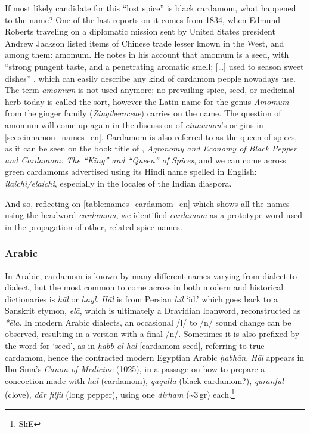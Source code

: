 If most likely candidate for this ``lost spice'' is black cardamom, what happened to the name? One of the last reports on it comes from 1834, when Edmund Roberts traveling on a diplomatic mission sent by United States president Andrew Jackson listed items of Chinese trade lesser known in the West, and among them: amomum. He notes in his account that amomum is a seed, with ``strong pungent taste, and a penetrating aromatic smell; […] used to season sweet dishes'' \autocite[135]{roberts_embassy_1837}, which can easily describe any kind of cardamom people nowadays use. The term \textit{amomum} is not used anymore; no prevailing spice, seed, or medicinal herb today is called the sort, however the Latin name for the genus \textit{Amomum} from the ginger family (\textit{Zingiberaceae}) carries on the name. The question of amomum will come up again in the discussion of \textit{cinnamon}'s origins in \cref{sec:cinnamon_names_en}. Cardamom is also referred to as the queen of spices, as it can be seen on the book title of \textcite{nair_agronomy_2011}, \textit{Agronomy and Economy
of Black Pepper and Cardamom: The ``King'' and ``Queen'' of Spices}, and we can come across green cardamoms advertised using its Hindi name spelled in English: \textit{ilaichi/elaichi}, especially in the locales of the Indian diaspora.

And so, reflecting on \cref{table:names_cardamom_en} which shows all the names using the headword \textit{cardamom}, we identified \textit{cardamom} as a prototype word used in the propagation of other, related spice-names.

\subsubsection{Arabic}



In Arabic, cardamom is known by many different names varying from dialect to dialect, but the most common to come across in both modern and historical dictionaries is  \textit{hāl} or \textit{hayl}.
\textit{Hāl} is from Persian  \textit{hil} `id.' which goes back to a Sanskrit etymon,   \textit{elā}, which is ultimately a Dravidian loanword, reconstructed as \textit{*ēla}. In modern Arabic dialects, an occasional /l/ to /n/ sound change can be observed, resulting in a version with a final /n/. Sometimes it is also prefixed by the word for `seed', as in \textit{ḥabb al-hāl} [cardamom seed], referring to true cardamom, hence the contracted modern Egyptian Arabic \textit{ḥabhān}. \textit{Hāl} appears in Ibn Sīnā's \textit{Canon of Medicine} (1025), in a passage on how to prepare a concoction made with \textit{hāl} (cardamom), \textit{qāqulla} (black cardamom?), \textit{qaranful} (clove), \textit{dār filfil} (long pepper), using one \textit{dirham} (\textasciitilde 3\,gr) each.\footnote{SkE}

